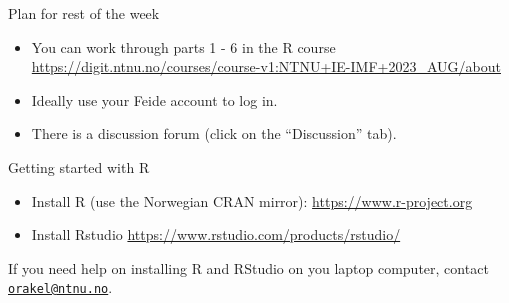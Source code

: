 \documentclass[
  10pt,
  ignorenonframetext,
]{beamer}
\providecommand{\tightlist}{%
  \setlength{\itemsep}{0pt}\setlength{\parskip}{0pt}}
\begin{document}
\begin{frame}{Plan for rest of the week}
\protect\hypertarget{plan-for-rest-of-the-week}{}
\(~\)

\begin{itemize}
\tightlist
\item
  You can work through parts 1 - 6 in the R course
  \url{https://digit.ntnu.no/courses/course-v1:NTNU+IE-IMF+2023_AUG/about}
\end{itemize}

\vspace{2mm}

\begin{itemize}
\tightlist
\item
  Ideally use your Feide account to log in.
\end{itemize}

\vspace{2mm}

\begin{itemize}
\tightlist
\item
  There is a discussion forum (click on the ``Discussion'' tab).
\end{itemize}
\end{frame}

\begin{frame}{Getting started with R}
\protect\hypertarget{getting-started-with-r}{}
\vspace{2mm}

\begin{itemize}
\tightlist
\item
  Install R (use the Norwegian CRAN mirror):
  \url{https://www.r-project.org}
\end{itemize}

\vspace{2mm}

\begin{itemize}
\tightlist
\item
  Install Rstudio \url{https://www.rstudio.com/products/rstudio/}
\end{itemize}

\vspace{4mm}

If you need help on installing R and RStudio on you laptop computer,
contact \href{mailto:orakel@ntnu.no}{\nolinkurl{orakel@ntnu.no}}.
\end{frame}
\end{document}
